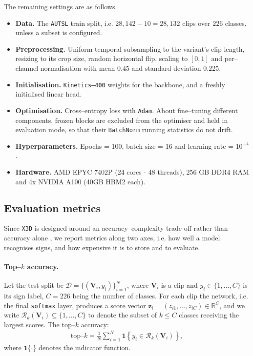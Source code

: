 The remaining settings are as follows.
\begin{itemize}[topsep=2pt, itemsep=2pt]
    \item \textbf{Data.} The \texttt{AUTSL} train split, i.e. $28{,}142 - 10 = 28{,}132$ clips over $226$ classes, unless a subset is configured.
    \item \textbf{Preprocessing.} Uniform temporal subsampling to the variant's clip length, resizing to its crop size, random horizontal flip, scaling to $[0,1]$ and per--channel normalisation with mean $0.45$ and standard deviation $0.225$.
    \item \textbf{Initialisation.} \texttt{Kinetics--400} weights for the backbone, and a freshly initialised linear head.
    \item \textbf{Optimisation.} Cross--entropy loss with \texttt{Adam}. About fine–tuning different components, frozen blocks are excluded from the optimiser and held in evaluation mode, so that their \texttt{BatchNorm} running statistics do not drift.
    \item \textbf{Hyperparameters.} Epochs = 100, batch size = 16 and learning rate = $10^{-4}$.
    \item \textbf{Hardware.} AMD EPYC 7402P (24 cores - 48 threads), 256 GB DDR4 RAM and 4x NVIDIA A100 (40GB HBM2 each).
\end{itemize}




\subsection{Evaluation metrics}
\label{sec:metrics}

Since \texttt{X3D} is designed around an accuracy–complexity trade-off rather than accuracy alone \cite{feichtenhofer2020x3d}, we report metrics along two axes, i.e. how well a model recognises signs, and how expensive it is to store and to evaluate.

\paragraph{Top–$k$ accuracy.}
Let the test split be $\mathcal D = \{(\mathbf V_i, y_i)\}_{i=1}^{N}$, where $\mathbf V_i$ is a clip and $y_i \in \{1, \ldots, C\}$ is its sign label, $C = 226$ being the number of classes.
For each clip the network, i.e. the final \texttt{softmax} layer, produces a score vector $\mathbf z_i = (z_{i1}, \ldots, z_{iC}) \in \mathbb R^C$, and we write $\mathcal R_k(\mathbf V_i) \subseteq \{1, \ldots, C\}$ to denote the subset of $k \le C$ classes receiving the largest scores.
The top–$k$ accuracy:
\begin{align}
    \text{top--}k = \frac{1}{N} \sum_{i=1}^{N} \mathbf 1 \left\{ y_i \in \mathcal R_k(\mathbf V_i) \right\},
\end{align}
where $\mathbf 1\{\cdot\}$ denotes the indicator function.

